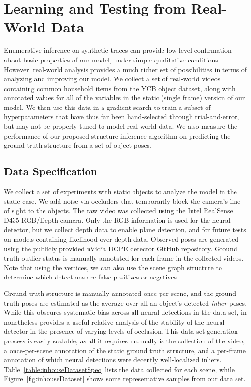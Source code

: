 \chapter{Learning and Testing from Real-World Data}

Enumerative inference on synthetic traces can provide low-level confirmation about basic properties of our model, under simple qualitative conditions.
However, real-world analysis provides a much richer set of possibilities in terms of analyzing and improving our model.
We collect a set of real-world videos containing common household items from the YCB object dataset, along with annotated values for all of the variables in the static (single frame) version of our model.
We then use this data in a gradient search to train a subset of hyperparameters that have thus far been hand-selected through trial-and-error, but may not be properly tuned to model real-world data.
We also measure the performance of our proposed structure inference algorithm on predicting the ground-truth structure from a set of object poses.

\section{Data Specification}
We collect a set of experiments with static objects to analyze the model in the static case.
We add noise via occluders that temporarily block the camera's line of sight to the objects.
The raw video was collected using the Intel RealSense D435 RGB/Depth camera.
Only the RGB information is used for the neural detector, but we collect depth data to enable plane detection, and for future tests on models containing likelihood over depth data.
Observed poses are generated using the publicly provided nVidia DOPE detector GitHub repository.
Ground truth outlier status is manually annotated for each frame in the collected videos.
Note that using the vertices, we can also use the scene graph structure to determine which detections are false positives or negatives.

Ground truth structure is manually annotated once per scene, and the ground truth poses are estimated as the average over all an object's detected \textit{inlier} poses.
While this obscures systematic bias across all neural detections in the data set, in nonetheless provides a useful relative analysis of the stability of the neural detector in the presence of varying levels of occlusion.
This data set generation process is easily scalable, as all it requires manually is the collection of the video, a once-per-scene annotation of the static ground truth structure, and a per-frame annotation of which neural detections were decently well-localized inliers.
Table~\ref{table:inhouseDatasetSpec} lists the data collected for each scene, while Figure~\ref{fig:inhouseDataset} shows some representative samples from our data set.

